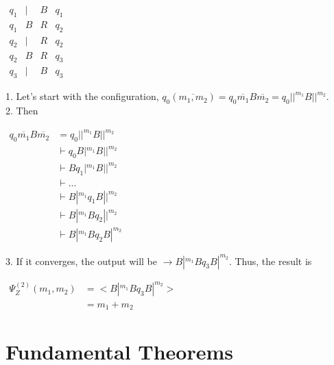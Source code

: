 \begin{center}					%
	$\begin{array}{llll}
	q_1  & |	& B &	q_1	\\
	q_1  & B	& R & q_2	\\
	q_2  & | & R & q_2	\\
	q_2  & B & R & q_3	\\
	q_3  & | & B & q_3	
	\end{array}$
\end{center}



1. Let's start with the configuration, $q_0(\overline{m_1, m_2}) = q_0\overline{m_1}B\overline{m_2} = q_0||^{m_1}B||^{m_2}$. \\

2. Then
\begin{center}
$	\begin{aligned}
		q_0\overline{m_1}B\overline{m_2} &= q_0||^{m_1}B||^{m_2}\\
		& \vdash q_0 B |^{m_1}B ||^{m_2}\\
		& \vdash Bq_1 |^{m_1}B||^{m_2}\\
		& \vdash ...\\
		& \vdash B|^{m_1}q_1 B||^{m_2}\\
		& \vdash B|^{m_1}Bq_2||^{m_2}\\
		& \vdash B|^{m_1}Bq_2B|^{m_2}
	\end{aligned}
	$
\end{center}

3. If it converges, the output will be $\rightarrow B|^{m_1}Bq_3B|^{m_2}$. Thus, the result is  
\begin{center}
$	\begin{aligned}
		\Psi_Z^{(2)}(m_1,m_2) &= <B|^{m_1}Bq_3B|^{m_2}>\\
		&=m_1+m_2
	\end{aligned}
$
\end{center}

\section{Fundamental Theorems}
